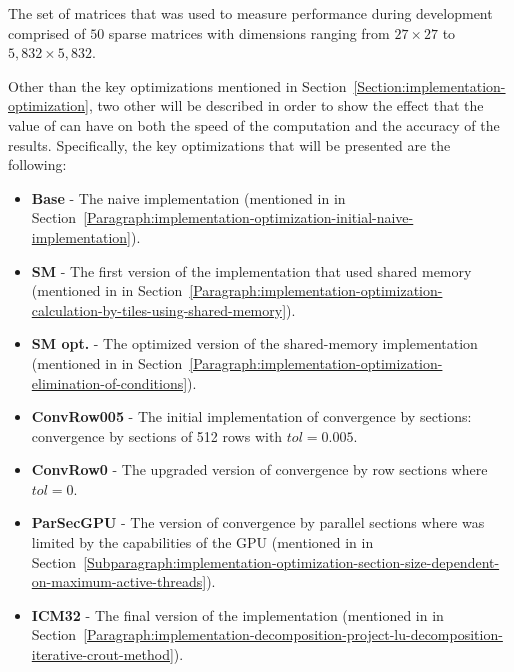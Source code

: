 The set of matrices that was used to measure performance during development comprised of $ 50 $ sparse matrices with dimensions ranging from $ 27\times 27 $ to $ 5,832\times 5,832 $.
\par Other than the key optimizations mentioned in Section~\ref{Section:implementation-optimization}, two other will be described in order to show the effect that the value of  can have on both the speed of the computation and the accuracy of the results. Specifically, the key optimizations that will be presented are the following:

\begin{itemize}
	\item \textbf{Base} - The naive implementation (mentioned in \textit{} in Section~\ref{Paragraph:implementation-optimization-initial-naive-implementation}).
	\item \textbf{SM} - The first version of the implementation that used shared memory (mentioned in \textit{} in Section~\ref{Paragraph:implementation-optimization-calculation-by-tiles-using-shared-memory}).
	\item \textbf{SM opt.} - The optimized version of the shared-memory implementation (mentioned in \textit{} in Section~\ref{Paragraph:implementation-optimization-elimination-of-conditions}).
	\item \textbf{ConvRow005} - The initial implementation of convergence by sections: convergence by sections of 512 rows with $ tol = 0.005 $.
	\item \textbf{ConvRow0} - The upgraded version of convergence by row sections where $ tol = 0 $.
	\item \textbf{ParSecGPU} - The version of convergence by parallel sections where  was limited by the capabilities of the GPU (mentioned in \textit{} in Section~\ref{Subparagraph:implementation-optimization-section-size-dependent-on-maximum-active-threads}).
	\item \textbf{ICM32} - The final version of the implementation (mentioned in \textit{} in Section~\ref{Paragraph:implementation-decomposition-project-lu-decomposition-iterative-crout-method}).
\end{itemize}

